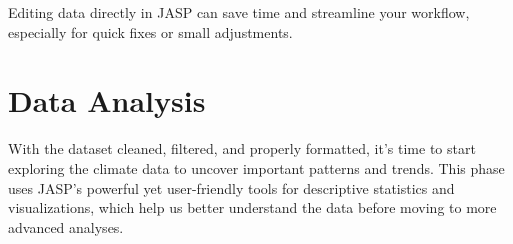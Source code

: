Editing data directly in JASP can save time and streamline your workflow, especially for quick fixes or small adjustments.

\section{Data Analysis}

With the dataset cleaned, filtered, and properly formatted, it’s time to start exploring the climate data to uncover important patterns and trends. This phase uses JASP’s powerful yet user-friendly tools for descriptive statistics and visualizations, which help us better understand the data before moving to more advanced analyses.
\clearpage









